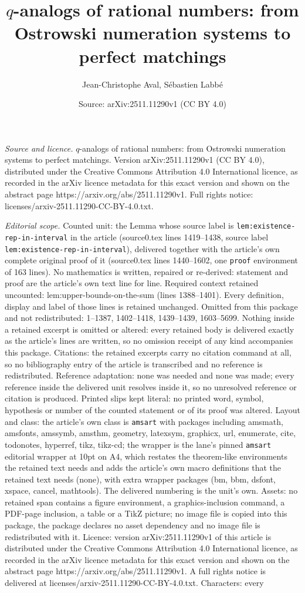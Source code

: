 \documentclass[10pt,a4paper]{amsart}
\title[$q$-analogs of rational numbers: from Ostrowski numeration s]{$q$-analogs of rational numbers: from Ostrowski numeration systems to perfect matchings}
\author{Jean-Christophe Aval, S\'ebastien Labb\'e}
\date{Source: arXiv:2511.11290v1 (CC BY 4.0)}
\begin{document}
\maketitle

\noindent\emph{Source and licence.} $q$-analogs of rational numbers: from Ostrowski numeration systems to perfect matchings. Version arXiv:2511.11290v1 (CC BY 4.0), distributed under the Creative Commons Attribution 4.0 International licence, as recorded in the arXiv licence metadata for this exact version and shown on the abstract page https://arxiv.org/abs/2511.11290v1. Full rights notice: licenses/arxiv-2511.11290-CC-BY-4.0.txt.\par\smallskip

\noindent\textit{Editorial scope.} Counted unit: the Lemma whose source label is \texttt{lem:existence-rep-in-interval} in the article (source0.tex lines 1419--1438, source label \texttt{lem:existence-rep-in-interval}), delivered together with the article's own complete original proof of it (source0.tex lines 1440--1602, one \texttt{proof} environment of 163 lines). No mathematics is written, repaired or re-derived: statement and proof are the article's own text line for line. Required context retained uncounted: lem:upper-bounds-on-the-sum (lines 1388--1401). Every definition, display and label of those lines is retained unchanged. Omitted from this package and not redistributed: 1--1387, 1402--1418, 1439--1439, 1603--5699. Nothing inside a retained excerpt is omitted or altered: every retained body is delivered exactly as the article's lines are written, so no omission receipt of any kind accompanies this package. Citations: the retained excerpts carry no citation command at all, so no bibliography entry of the article is transcribed and no reference is redistributed. Reference adaptation: none was needed and none was made; every reference inside the delivered unit resolves inside it, so no unresolved reference or citation is produced. Printed slips kept literal: no printed word, symbol, hypothesis or number of the counted statement or of its proof was altered. Layout and class: the article's own class is \texttt{amsart} with packages including amsmath, amsfonts, amssymb, amsthm, geometry, latexsym, graphicx, url, enumerate, cite, todonotes, hyperref, tikz, tikz-cd; the wrapper is the lane's pinned \texttt{amsart} editorial wrapper at 10pt on A4, which restates the theorem-like environments the retained text needs and adds the article's own macro definitions that the retained text needs (none), with extra wrapper packages (bm, bbm, dsfont, xspace, cancel, mathtools). The delivered numbering is the unit's own. Assets: no retained span contains a figure environment, a graphics-inclusion command, a PDF-page inclusion, a table or a TikZ picture; no image file is copied into this package, the package declares no asset dependency and no image file is redistributed with it. Licence: version arXiv:2511.11290v1 of this article is distributed under the Creative Commons Attribution 4.0 International licence, as recorded in the arXiv licence metadata for this exact version and shown on the abstract page https://arxiv.org/abs/2511.11290v1. A full rights notice is delivered at licenses/arxiv-2511.11290-CC-BY-4.0.txt. Characters: every 
\end{document}
